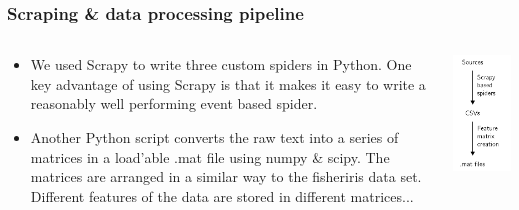\documentclass{beamer}
\begin{document}
\begin{frame}
  \frametitle{Scraping \& data processing pipeline}
  \begin{columns}[onlytextwidth]
    \begin{column}{0.7\textwidth}
      \begin{itemize}
        \item We used Scrapy to write three custom spiders in Python. One key
          advantage of using Scrapy is that it makes it easy to write a reasonably
          well performing event based spider.\pause{}

        \item Another Python script converts the raw text into a series of
          matrices in a load'able .mat file using numpy \& scipy. The matrices
          are arranged in a similar way to the fisheriris data set.  Different
          features of the data are stored in different matrices...
      \end{itemize}
    \end{column}
      \begin{column}{0.3\textwidth}
      \includegraphics{pipeline.pdf}
    \end{column}
  \end{columns}
\end{frame}
\end{document}

